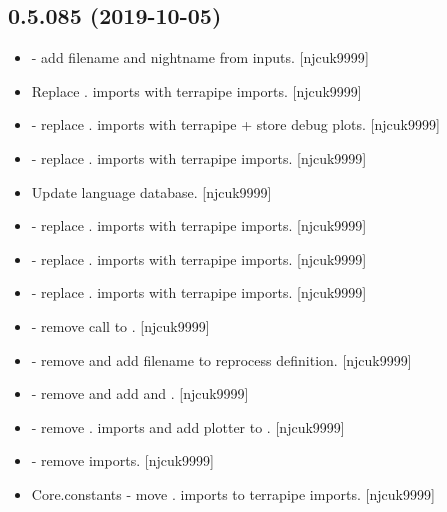 \documentclass[a4paper,10pt,english]{report}
\begin{document}
\subsection{0.5.085 (2019-10-05)}
\label{\detokenize{misc/changelog:id58}}\begin{itemize}
\item {} 
 - add filename and nightname from
inputs. {[}njcuk9999{]}

\item {} 
Replace . imports with terrapipe imports. {[}njcuk9999{]}

\item {} 
 - replace . imports with terrapipe + store debug
plots. {[}njcuk9999{]}

\item {} 
 - replace . imports with terrapipe imports.
{[}njcuk9999{]}

\item {} 
Update language database. {[}njcuk9999{]}

\item {} 
 - replace . imports with terrapipe imports. {[}njcuk9999{]}

\item {} 
 - replace . imports with terrapipe imports.
{[}njcuk9999{]}

\item {} 
 - replace . imports with terrapipe imports. {[}njcuk9999{]}

\item {} 
 - remove call to
. {[}njcuk9999{]}

\item {} 
 - remove  and
add filename to reprocess definition. {[}njcuk9999{]}

\item {} 
 - remove  and add
 and . {[}njcuk9999{]}

\item {} 
 - remove . imports and add plotter to .
{[}njcuk9999{]}

\item {} 
 - remove imports. {[}njcuk9999{]}

\item {} 
Core.constants - move . imports to terrapipe imports. {[}njcuk9999{]}

\end{itemize}
\end{document}
